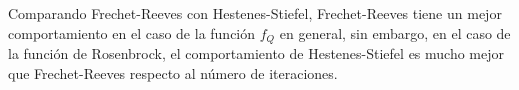 \documentclass[11pt]{article}
\begin{document}
    Comparando Frechet-Reeves con Hestenes-Stiefel, Frechet-Reeves tiene un
mejor comportamiento en el caso de la función \(f_Q\) en general, sin
embargo, en el caso de la función de Rosenbrock, el comportamiento de
Hestenes-Stiefel es mucho mejor que Frechet-Reeves respecto al número de
iteraciones.


    
    
    
\end{document}
